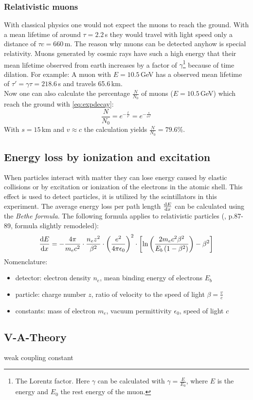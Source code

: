 \subsubsection{Relativistic muons}
With classical physics one would not expect the muons to reach the ground. With a mean lifetime of around $\tau=2.2$\,\textmu s they would 
travel with light speed only a distance of  $\tau c = 660$\,m. The reason why muons can be detected anyhow is special relativity. Muons generated 
by cosmic rays have such a high energy that their mean lifetime observed from earth increases by a factor of 
$\gamma$\footnote{The Lorentz factor. Here $\gamma$ can be calculated with $\gamma = \frac{E}{E_0}$, where $E$ is the energy and $E_0$ the rest energy of the muon.} 
because of time dilation. For example: A muon with $E=10.5$\,GeV has a observed mean lifetime of $\tau'=\gamma \tau=218.6$\,\textmu s and travels 65.6\,km. \\
Now one can also calculate the percentage $\frac{N}{N_0}$ of muons ($E=10.5$\,GeV) which reach the ground with \autoref{eq:expdecay}:
\begin{equation}
    \frac{N}{N_0} = e^{-\frac{t}{\tau'}} = e^{-\frac{s}{v\tau'}}
\end{equation}
With $s=15$\,km and $v \approx c$ the calculation yields $\frac{N}{N_0} = 79.6\%$.
\subsection{Energy loss by ionization and excitation}
When particles interact with matter they can lose energy caused by elastic collisions or by excitation or ionization of the electrons in the 
atomic shell. This effect is used to detect particles, it is utilized by the scintillators in this experiment. The average energy loss per path length 
$\frac{\mathrm{d} E}{\mathrm{d} x}$ can be calculated using the \emph{Bethe formula}. The following formula applies to relativistic particles (\cite{dem4}, p.87-89, formula slightly remodeled):
\begin{equation}
    \frac{\mathrm{d} E}{\mathrm{d} x} = - \frac{4 \pi}{m_e c^2} \cdot \frac{n_e z^2}{\beta^2} \cdot \left( \frac{e^2}{4 \pi \epsilon_0} \right)^2 \cdot \left[ \ln \left( \frac{2 m_e c^2 \beta^2}{E_b \left( 1-\beta^2 \right)  } \right) - \beta^2 \right]
\end{equation}
Nomenclature: 
\begin{itemize}
  \item detector: electron density $n_e$, mean binding energy of electrons $E_b$
  \item particle: charge number $z$, ratio of velocity to the speed of light $\beta = \frac{v}{c}$
  \item constants: mass of electron $m_e$, vacuum permittivity $\epsilon_0$, speed of light $c$
\end{itemize}
\subsection{V-A-Theory}
weak coupling constant